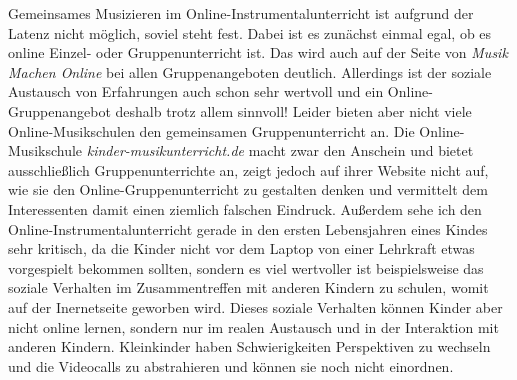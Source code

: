 Gemeinsames Musizieren im Online-Instrumentalunterricht ist aufgrund der Latenz
nicht möglich, soviel steht fest. Dabei ist es zunächst einmal egal, ob es
online Einzel- oder Gruppenunterricht ist. Das wird auch auf der Seite von
\emph{Musik Machen Online} bei allen Gruppenangeboten deutlich. Allerdings ist
der soziale Austausch von Erfahrungen auch schon sehr wertvoll und ein
Online-Gruppenangebot deshalb trotz allem sinnvoll! Leider bieten aber nicht
viele Online-Musikschulen den gemeinsamen Gruppenunterricht an. Die
Online-Musikschule \emph{kinder-musikunterricht.de} macht zwar den Anschein und
bietet ausschließlich Gruppenunterrichte an, zeigt jedoch auf ihrer Website
nicht auf, wie sie den Online-Gruppenunterricht zu gestalten denken und
vermittelt dem Interessenten damit einen ziemlich falschen Eindruck. Außerdem
sehe ich den Online-Instrumentalunterricht gerade in den ersten Lebensjahren
eines Kindes sehr kritisch, da die Kinder nicht vor dem Laptop von einer
Lehrkraft etwas vorgespielt bekommen sollten, sondern es viel wertvoller ist
beispielsweise das soziale Verhalten im Zusammentreffen mit anderen Kindern zu
schulen, womit auf der Inernetseite geworben wird. Dieses soziale Verhalten
können Kinder aber nicht online lernen, sondern nur im realen Austausch und in
der Interaktion mit anderen Kindern. Kleinkinder haben Schwierigkeiten
Perspektiven zu wechseln und die Videocalls zu abstrahieren und können sie noch
nicht einordnen.


